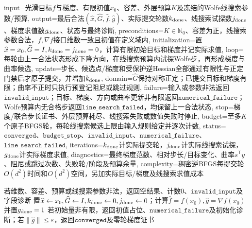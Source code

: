 \begin{AlgorithmContract}{
  input={光滑目标$f$与梯度、有限初值$x_0$、容差、外层预算$K$及冻结的Wolfe线搜索参数/预算},
  output={最后合法$(\widehat x,\widehat G,\widehat f,\widehat g)$、实际提交轮数$k_{\rm done}$、线搜索试探数$j_{\rm done}$、梯度求值数$g_{\rm done}$、状态与最终诊断},
  preconditions={$K\in\mathbb N_0$、容差为正，线搜索参数合法，$f,\nabla f$接口维数一致且初值在定义域内},
  initialization={置$\widehat x=x_0,\widehat G=I,k_{\rm done}=j_{\rm done}=0$，计算有限初始目标和梯度并记实际求值},
  loop={每轮由上一合法状态形成下降方向，在线搜索预算内试探Wolfe步，再形成梯度与曲率候选},
  update={步长、候选点/梯度和受保护逆Hessian全部通过有限性与正定门禁后才原子提交，并增加$k_{\rm done}$},
  domain={$\widehat G$保持对称正定；已提交目标和梯度有限；曲率不正时只执行预登记阻尼或跳过规则},
  failure={输入或参数非法返回$\mathtt{invalid\_input}$；目标、梯度、方向或曲率更新非有限返回$\mathtt{numerical\_failure}$；Wolfe预算内无合格步返回$\mathtt{line\_search\_failed}$，均保留上一合法状态},
  stop={梯度/联合步长证书、外层预算耗尽、线搜索失败或数值失败时停止},
  budget={至多$K$个原子BFGS轮，每轮线搜索候选上限由输入规则给定并逐次计数},
  status={$\mathtt{converged}$、$\mathtt{budget\_stop}$、$\mathtt{invalid\_input}$、$\mathtt{numerical\_failure}$、$\mathtt{line\_search\_failed}$},
  iterations={$k_{\rm done}$计实际提交轮，$j_{\rm done}$计实际线搜索试探，$g_{\rm done}$计实际梯度求值},
  diagnostics={最终梯度范数、相对步长/目标变化、曲率$s^\mathsf Ty$、阻尼或跳过次数、失败轮/阶段及预算余量},
  complexity={稠密逆BFGS每提交轮$O(d^2)$时间和$O(d^2)$空间，另加实际目标/梯度及线搜索求值成本}
}
\begin{algorithm}[H]
\caption{带曲率保护的逆BFGS方法}\label{alg:V1-C08-bfgs}
若维数、容差、预算或线搜索参数非法，返回空结果、计数$0$、$\mathtt{invalid\_input}$及字段诊断\;
置$\widehat x\leftarrow x_0,\widehat G\leftarrow I,k_{\rm done}\leftarrow0,j_{\rm done}\leftarrow0$；计算$\widehat f=f(x_0),\widehat g=\nabla f(x_0)$并置$g_{\rm done}=1$\;
若初始量非有限，返回初值占位、$\mathtt{numerical\_failure}$及初始化诊断；若$\|\widehat g\|\le\varepsilon$，返回$\mathtt{converged}$及零轮梯度证书\;
\end{algorithm}
\end{AlgorithmContract}
